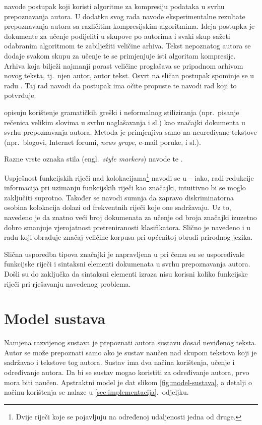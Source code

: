 \documentclass{article}
\newcommand{\engl}[1]{(engl.~\emph{#1})}
\begin{document}
\citet{kukushkina2001using} navode postupak koji koristi algoritme za kompresiju
podataka u svrhu prepoznavanja autora. U dodatku svog rada navode eksperimentalne
rezultate prepoznavanja autora sa različitim kompresijskim algoritmima. Ideja
postupka je dokumente za učenje podijeliti u skupove po autorima i svaki skup
sažeti odabranim algoritmom te zabilježiti veličine arhiva. Tekst nepoznatog
autora se dodaje svakom skupu za učenje te se primjenjuje isti algoritam
kompresije. Arhiva koja bilježi najmanji porast veličine proglašava se
pripadnom arhivom novog teksta, tj.~njen autor, autor tekst. Osvrt na sličan
postupak spominje se u radu \citep{zhao2005effective}. Taj rad navodi
da postupak ima očite propuste te navodi rad koji to potvrđuje.

\citet{koppel2003exploiting} opisuju korištenje gramatičkih greški i
neformalnog stiliziranja (npr.~pisanje rečenica velikim slovima u svrhu
naglašavanja i sl.) kao značajki dokumenta u svrhu prepoznavanja autora. Metoda
je primjenjiva samo na neuređivane tekstove (npr.~blogovi, Internet forumi,
\emph{news grupe}, e-mail poruke, i sl.).

Razne vrste oznaka stila \engl{style markers} navode \citet{diri2003automatic}
te \citet{luyckx2005shallow}.

Uspješnost funkcijskih riječi nad kolokacijama\footnote{Dvije riječi koje se
pojavljuju na određenoj udaljenosti jedna od druge.} navodi se u
\citep{argamon2005measuring} -- iako, radi redukcije informacija pri uzimanju
funkcijskih riječi kao značajki, intuitivno bi se moglo zaključiti suprotno.
Također se navodi sumnja da zapravo diskriminatorna osobina kolokacija dolazi
od frekventnih riječi koje one sadržavaju. Uz to, navedeno je da znatno veći
broj dokumenata za učenje od broja značajki izuzetno dobro smanjuje
vjerojatnost pretreniranosti klasifikatora. Slično je navedeno i u
radu \citep{banko2001scaling} koji obrađuje značaj veličine korpusa pri
općenitoj obradi prirodnog jezika.

Slična usporedba tipova značajki je napravljena u \citep{uzuner2005comparative}
pri čemu su se uspoređivale funkcijske riječi i sintaksni elementi dokumenata u
svrhu prepoznavanja autora. Došli su do zaključka da sintaksni elementi izraza
nisu korisni koliko funkcijske riječi pri rješavanju navedenog problema.

\section{Model sustava}
Namjena razvijenog sustava je prepoznati autora sustavu dosad neviđenog teksta.
Autor se može prepoznati samo ako je sustav naučen nad skupom tekstova koji je
sadržavao i tekstove tog autora. Sustav ima dva načina korištenja, učenje i
određivanje autora. Da bi se sustav mogao koristiti za određivanje autora, prvo
mora biti naučen. Apstraktni model je dat slikom \ref{fig:model-sustava}, a
detalji o načinu korištenja se nalaze u \ref{sec:implementacija}.~odjeljku.
\end{document}
